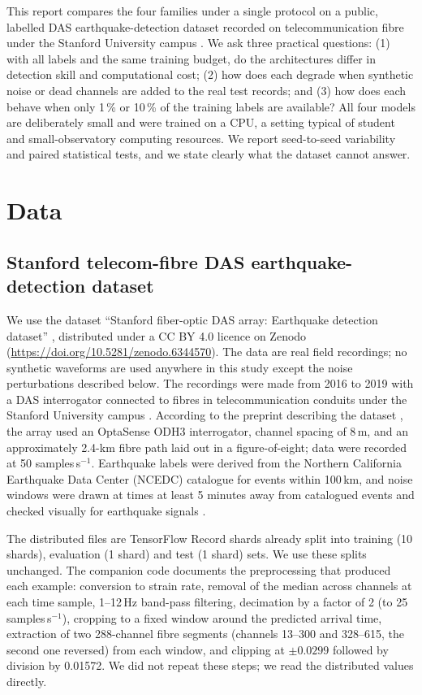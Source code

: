 This report compares the four families under a single protocol on a public, labelled DAS earthquake-detection dataset recorded on telecommunication fibre under the Stanford University campus \citep{HuotData2022,Huot2024}. We ask three practical questions: (1) with all labels and the same training budget, do the architectures differ in detection skill and computational cost; (2) how does each degrade when synthetic noise or dead channels are added to the real test records; and (3) how does each behave when only 1\,\% or 10\,\% of the training labels are available? All four models are deliberately small and were trained on a CPU, a setting typical of student and small-observatory computing resources. We report seed-to-seed variability and paired statistical tests, and we state clearly what the dataset cannot answer.

\section*{Data}
\subsection*{Stanford telecom-fibre DAS earthquake-detection dataset}
We use the dataset ``Stanford fiber-optic DAS array: Earthquake detection dataset'' \citep{HuotData2022}, distributed under a CC BY 4.0 licence on Zenodo (\url{https://doi.org/10.5281/zenodo.6344570}). The data are real field recordings; no synthetic waveforms are used anywhere in this study except the noise perturbations described below. The recordings were made from 2016 to 2019 with a DAS interrogator connected to fibres in telecommunication conduits under the Stanford University campus \citep{Huot2024}. According to the preprint describing the dataset \citep{HuotArxiv2022}, the array used an OptaSense ODH3 interrogator, channel spacing of 8\,m, and an approximately 2.4-km fibre path laid out in a figure-of-eight; data were recorded at 50 samples\,s$^{-1}$. Earthquake labels were derived from the Northern California Earthquake Data Center (NCEDC) catalogue for events within 100\,km, and noise windows were drawn at times at least 5 minutes away from catalogued events and checked visually for earthquake signals \citep{HuotArxiv2022}.

The distributed files are TensorFlow Record shards already split into training (10 shards), evaluation (1 shard) and test (1 shard) sets. We use these splits unchanged. The companion code \citep{HuotCode2022} documents the preprocessing that produced each example: conversion to strain rate, removal of the median across channels at each time sample, 1--12\,Hz band-pass filtering, decimation by a factor of 2 (to 25 samples\,s$^{-1}$), cropping to a fixed window around the predicted arrival time, extraction of two 288-channel fibre segments (channels 13--300 and 328--615, the second one reversed) from each window, and clipping at $\pm0.0299$ followed by division by 0.01572. We did not repeat these steps; we read the distributed values directly.


